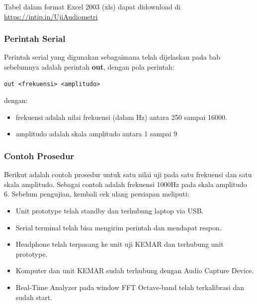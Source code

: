 \documentclass[12pt,]{article}
\begin{document}
	Tabel dalam format Excel 2003 (xls) dapat didownload di \url{https://intip.in/UjiAudiometri}
	
	\subsubsection{Perintah Serial}
	
	Perintah serial yang digunakan sebagaimana telah dijelaskan pada bab sebelumnya adalah perintah \textbf{out},
	dengan pola perintah:
	\begin{verbatim}
out <frekuensi> <amplitudo>
	\end{verbatim}
	dengan:
	\begin{itemize}
		\item frekuensi adalah nilai frekuensi (dalam Hz) antara 250 sampai 16000.
		\item amplitudo adalah skala amplitudo antara 1 sampai 9
	\end{itemize}

	\newpage
	\subsubsection{Contoh Prosedur}
	
	Berikut adalah contoh prosedur untuk satu nilai uji pada satu frekuensi dan satu skala amplitudo.
	Sebagai contoh adalah frekuensi 1000Hz pada skala amplitudo 6.
	Sebelum pengujian, kembali cek ulang persiapan meliputi:
	\begin{itemize}
		\item Unit prototype telah standby dan terhubung laptop via USB.
		\item Serial terminal telah bisa mengirim perintah dan mendapat respon.
		\item Headphone telah terpasang ke unit uji KEMAR dan terhubung unit prototype.
		\item Komputer dan unit KEMAR sudah terhubung dengan Audio Capture Device.
		\item Real-Time Analyzer pada window FFT Octave-band telah terkalibrasi dan sudah start.
	\end{itemize}
\end{document}
